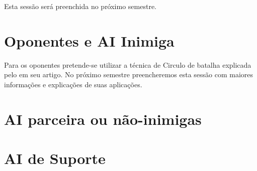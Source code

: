 Esta sessão será preenchida no próximo semestre.

\section{Oponentes e AI Inimiga}

Para os oponentes pretende-se utilizar a técnica de Circulo de batalha explicada pelo  em seu artigo. No próximo semestre preencheremos esta sessão com maiores informações e explicações de suas aplicações.


\section{AI parceira ou não-inimigas}


\section{AI de Suporte}
